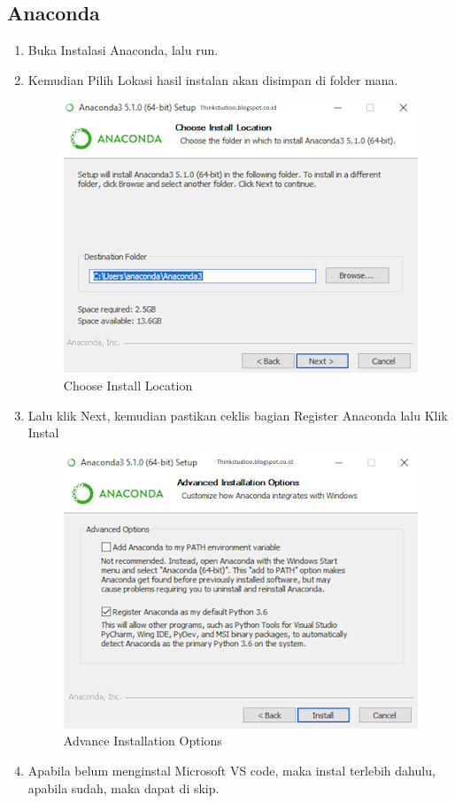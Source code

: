 \documentclass[lipt]{Article}
\begin{document}
\subsection{Anaconda}
\begin{enumerate}
\item 
Buka Instalasi Anaconda, lalu run.
\item
Kemudian Pilih Lokasi hasil instalan akan disimpan di folder mana.
\begin{figure}[!htbp]
\centering
\includegraphics{1.png}
\caption{ Choose Install Location }
\label{1}
\end{figure}
\item
Lalu klik Next, kemudian pastikan ceklis bagian Register Anaconda lalu Klik Instal
\begin{figure}[!htbp]
\centering
\includegraphics{2.png}
\caption{ Advance Installation Options }
\label{2}
\end{figure}
\item
Apabila belum menginstal Microsoft VS code, maka instal terlebih dahulu, apabila sudah, maka dapat di skip.

\end{enumerate}
\end{document}
